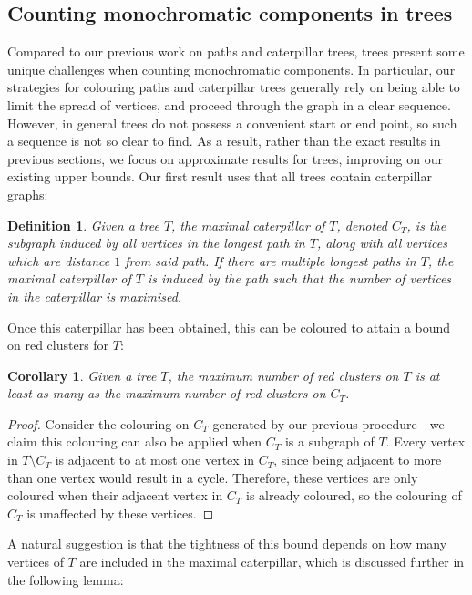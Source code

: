 \documentclass{mpaper}
\newtheorem{definition}{Definition}[section]
\newtheorem{corollary}{Corollary}[section]
\begin{document}
\subsection*{Counting monochromatic components in trees}

Compared to our previous work on paths and caterpillar trees, trees present some unique challenges when counting monochromatic components. In particular, our strategies for colouring paths and caterpillar trees generally rely on being able to limit the spread of vertices, and proceed through the graph in a clear sequence. However, in general trees do not possess a convenient start or end point, so such a sequence is not so clear to find. As a result, rather than the exact results in previous sections, we focus on approximate results for trees, improving on our existing upper bounds. Our first result uses that all trees contain caterpillar graphs:

\begin{definition}
  \label{def/maximal-caterpillar}
  Given a tree $T$, the \emph{maximal caterpillar of $T$}, denoted $C_T$, is the subgraph induced by all vertices in the longest path in $T$, along with all vertices which are distance $1$ from said path. If there are multiple longest paths in $T$, the maximal caterpillar of $T$ is induced by the path such that the number of vertices in the caterpillar is maximised.
\end{definition}

Once this caterpillar has been obtained, this can be coloured to attain a bound on red clusters for $T$:

\begin{corollary}
  \label{def/tree-caterpillar}
  Given a tree $T$, the maximum number of red clusters on $T$ is at least as many as the maximum number of red clusters on $C_T$.
\end{corollary}

\begin{proof}
  Consider the colouring on $C_T$ generated by our previous procedure - we claim this colouring can also be applied when $C_T$ is a subgraph of $T$. Every vertex in $T \setminus C_T$ is adjacent to at most one vertex in $C_T$, since being adjacent to more than one vertex would result in a cycle. Therefore, these vertices are only coloured when their adjacent vertex in $C_T$ is already coloured, so the colouring of $C_T$ is unaffected by these vertices.
\end{proof}

A natural suggestion is that the tightness of this bound depends on how many vertices of $T$ are included in the maximal caterpillar, which is discussed further in the following lemma:
\end{document}
